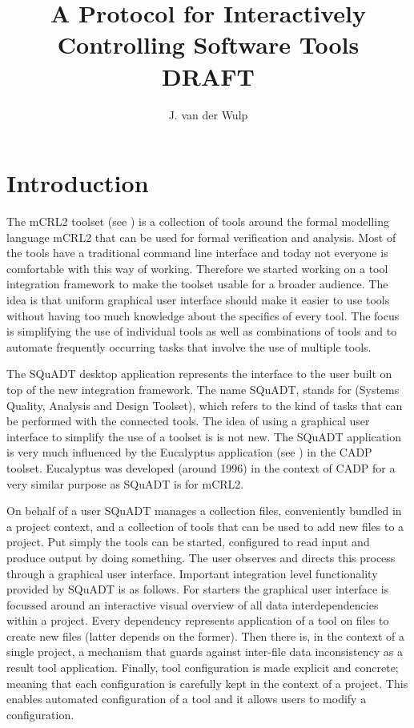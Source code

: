 \documentclass{article}
\title{A Protocol for Interactively Controlling Software Tools\\DRAFT}
\author{J. van der Wulp}
\newcommand{\squadt}{SQuADT\xspace}
\begin{document}
\maketitle
\thispagestyle{empty}

 \section{Introduction}

  The mCRL2 toolset (see \cite{groote_et_al:DSP:2007:862}) is a collection of
  tools around the formal modelling language mCRL2 that can be used for formal
  verification and analysis.  Most of the tools have a traditional command line
  interface and today not everyone is comfortable with this way of working.
  Therefore we started working on a tool integration framework to make the
  toolset usable for a broader audience. The idea is that uniform graphical
  user interface should make it easier to use tools without having too much
  knowledge about the specifics of every tool.  The focus is simplifying the
  use of individual tools as well as combinations of tools and to automate
  frequently occurring tasks that involve the use of multiple tools.
  
  The \squadt desktop application represents the interface to the user built on
  top of the new integration framework. The name \squadt, stands for (Systems
  Quality, Analysis and Design Toolset), which refers to the kind of tasks that
  can be performed with the connected tools.  The idea of using a graphical
  user interface to simplify the use of a toolset is is not new. The \squadt
  application is very much influenced by the Eucalyptus application (see
  \cite{CADP}) in the CADP toolset. Eucalyptus was developed (around 1996) in
  the context of CADP for a very similar purpose as \squadt is for mCRL2.
  
  
  On behalf of a user \squadt manages a collection files, conveniently bundled
  in a project context, and a collection of tools that can be used to add new
  files to a project. Put simply the tools can be started, configured to read
  input and produce output by doing something. The user observes and directs this
  process through a graphical user interface. Important integration level
  functionality provided by \squadt is as follows. For starters the graphical
  user interface is focussed around an interactive visual overview of all data
  interdependencies within a project. Every dependency represents application
  of a tool on files to create new files (latter depends on the former).  Then
  there is, in the context of a single project, a mechanism that guards against
  inter-file data inconsistency as a result tool application. Finally, tool
  configuration is made explicit and concrete; meaning that each configuration
  is carefully kept in the context of a project. This enables automated
  configuration of a tool and it allows users to modify a configuration.
\end{document}
